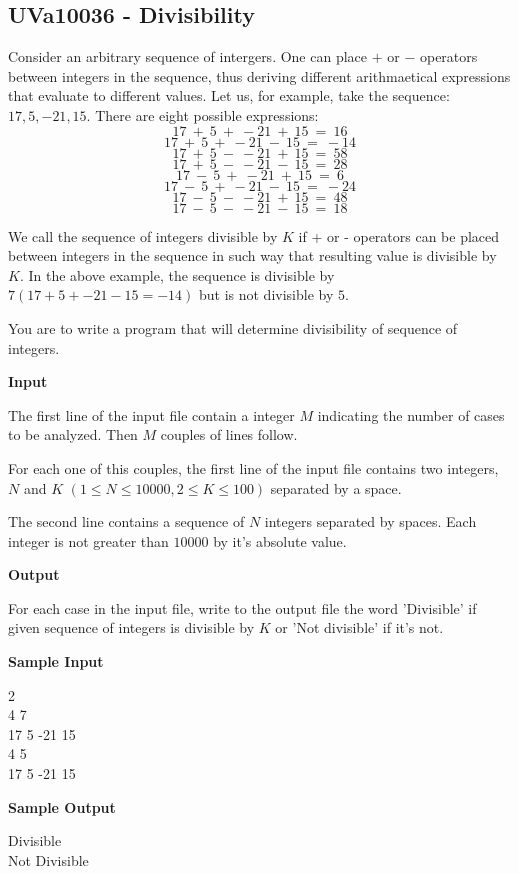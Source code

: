 \subsection{UVa10036 - Divisibility}
Consider an arbitrary sequence of intergers. One can place $+$ or $-$ operators between integers in the sequence, thus deriving different arithmaetical expressions that evaluate to different values. Let us, for example, take the sequence: $17, 5, -21, 15$. There are eight possible expressions:
\[ 17 \ + \ 5 \ + \ -21 \ + \ 15 \ = \ 16 \]
\[ 17 \ + \ 5 \ + \ -21 \ - \ 15 \ = \ -14 \]
\[ 17 \ + \ 5 \ - \ -21 \ + \ 15 \ = \ 58 \]
\[ 17 \ + \ 5 \ - \ -21 \ - \ 15 \ = \ 28 \]
\[ 17 \ - \ 5 \ + \ -21 \ + \ 15 \ = \ 6 \]
\[ 17 \ - \ 5 \ + \ -21 \ - \ 15 \ = \ -24 \]
\[ 17 \ - \ 5 \ - \ -21 \ + \ 15 \ = \ 48 \]
\[ 17 \ - \ 5 \ - \ -21 \ - \ 15 \ = \ 18 \]

We call the sequence of integers divisible by $K$ if + or - operators can be placed between integers in the sequence in such way that resulting value is divisible by $K$. In the above example, the sequence is divisible by $7(17+5+-21-15=-14)$ but is not divisible by $5$.

You are to write a program that will determine divisibility of sequence of integers.

\begin{flushleft}
{\color{red} \textbf{Input}}
\end{flushleft}
The first line of the input file contain a integer $M$ indicating the number of cases to be analyzed. Then $M$ couples of lines follow.

For each one of this couples, the first line of the input file contains two integers, $N$ and $K$ $(1 \leq N \leq 10000, 2 \leq K \leq 100)$ separated by a space.

The second line contains a sequence of $N$ integers separated by spaces. Each integer is not greater than $10000$ by it's absolute value.

\begin{flushleft}
{\color{red} \textbf{Output}}
\end{flushleft}
For each case in the input file, write to the output file the word 'Divisible' if given sequence of integers is divisible by $K$ or 'Not divisible' if it's not.

\begin{flushleft}
{\color{red} \textbf{Sample Input}}
\end{flushleft}
\begin{flushleft}
2\\
4 7\\
17 5 -21 15\\
4 5\\
17 5 -21 15\\
\end{flushleft}

\begin{flushleft}
{\color{red} \textbf{Sample Output}}
\end{flushleft}
\begin{flushleft}
Divisible\\
Not Divisible\\
\end{flushleft}

\newpage